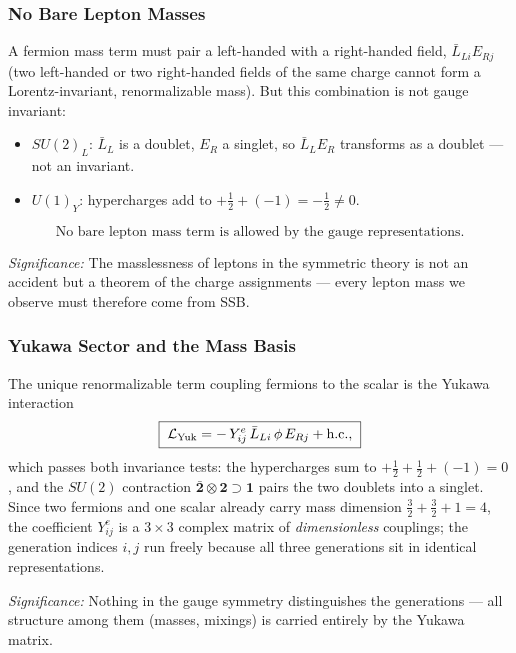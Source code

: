 \subsubsection*{No Bare Lepton Masses}

A fermion mass term must pair a left-handed with a right-handed field, $\bar L_{Li}E_{Rj}$ (two left-handed or two right-handed fields of the same charge cannot form a Lorentz-invariant, renormalizable mass). But this combination is not gauge invariant:
\begin{itemize}
  \item \textbf{$SU(2)_L$}: $\bar L_L$ is a doublet, $E_R$ a singlet, so $\bar L_L E_R$ transforms as a doublet --- not an invariant.
  \item \textbf{$U(1)_Y$}: hypercharges add to $+\tfrac12+(-1)=-\tfrac12\neq0$.
\end{itemize}
\begin{equation}
  \boxed{\;\text{No bare lepton mass term is allowed by the gauge representations.}\;}
  \label{eq:lec17:no_bare_mass}
\end{equation}

\textit{Significance:} The masslessness of leptons in the symmetric theory is not an accident but a theorem of the charge assignments --- every lepton mass we observe must therefore come from SSB.

\subsubsection*{Yukawa Sector and the Mass Basis}

The unique renormalizable term coupling fermions to the scalar is the Yukawa interaction
\begin{equation}
  \boxed{\;
  \mathcal{L}_{\rm Yuk}
  =-\,Y^e_{ij}\,\bar L_{Li}\,\phi\,E_{Rj}+\text{h.c.} ,
  \;}
  \label{eq:lec17:lsm_yukawa}
\end{equation}
which passes both invariance tests: the hypercharges sum to $+\tfrac12+\tfrac12+(-1)=0$, and the $SU(2)$ contraction $\bar{\mathbf{2}}\otimes\mathbf{2}\supset\mathbf{1}$ pairs the two doublets into a singlet. Since two fermions and one scalar already carry mass dimension $\tfrac32+\tfrac32+1=4$, the coefficient $Y^e_{ij}$ is a $3\times3$ complex matrix of \emph{dimensionless} couplings; the generation indices $i,j$ run freely because all three generations sit in identical representations.

\textit{Significance:} Nothing in the gauge symmetry distinguishes the generations --- all structure among them (masses, mixings) is carried entirely by the Yukawa matrix.

